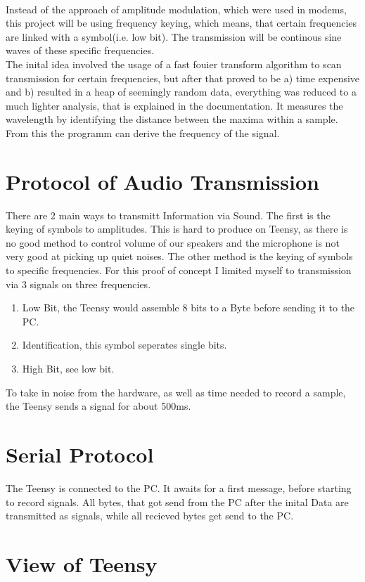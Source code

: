 \documentclass{book}
\begin{document}
\\Instead of the approach of amplitude modulation, which were used in modems, this project will be using frequency keying, which means, that certain frequencies are linked with a symbol(i.e. low bit). The transmission will be continous sine waves of these specific frequencies.
\\The inital idea involved the usage of a fast fouier transform algorithm to scan transmission for certain frequencies, but after that proved to be a) time expensive and b) resulted in a heap of seemingly random data, everything was reduced to a much lighter analysis, that is explained in the documentation. It measures the wavelength by identifying the distance between the maxima within a sample. From this the programm can derive the frequency of the signal. 

\chapter{Protocol of Audio Transmission}
There are 2 main ways to transmitt Information via Sound. The first is the keying of symbols to amplitudes. This is hard to produce on Teensy, as there is no good method to control volume of our speakers and the microphone is not very good at picking up quiet noises. The other method is the keying of symbols to specific frequencies. For this proof of concept I limited myself to transmission via 3 signals on three frequencies.
\begin{enumerate}
\item Low Bit, the Teensy would assemble 8 bits to a Byte before sending it to the PC.
\item Identification, this symbol seperates single bits.
\item High Bit, see low bit.
\end{enumerate}
To take in noise from the hardware, as well as time needed to record a sample, the Teensy sends a signal for about 500ms.

\chapter{Serial Protocol}
The Teensy is connected to the PC. It awaits for a first message, before starting to record signals. All bytes, that got send from the PC after the inital Data are transmitted as signals, while all recieved bytes get send to the PC.

\chapter{View of Teensy}
\end{document}
